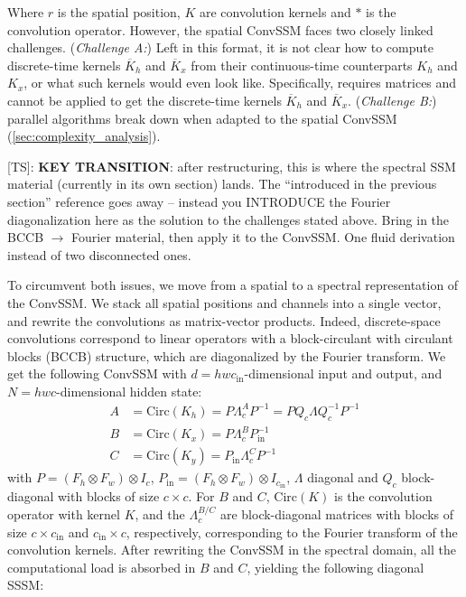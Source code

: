 \documentclass{article}
\newcommand{\TS}[1]{{\color{pink}[TS]: #1}}
\begin{document}
Where $r$ is the spatial position, $K$ are convolution kernels and $\ast$ is the convolution operator. However, the spatial ConvSSM faces two closely linked challenges.
%
(\emph{Challenge A:}) Left in this format, it is not clear how to compute discrete-time kernels $\overline{K}_h$ and $\overline{K}_x$ from their continuous-time counterparts $K_h$ and $K_x$, or what such kernels would even look like. Specifically,  requires matrices and cannot be applied to get the discrete-time kernels $\overline{K}_h$ and $\overline{K}_x$.
%
(\emph{Challenge B:}) parallel algorithms break down when adapted to the spatial ConvSSM (\cref{sec:complexity_analysis}).

\TS{\textbf{KEY TRANSITION}: after restructuring, this is where the spectral SSM material (currently in its own section) lands. The ``introduced in the previous section'' reference goes away -- instead you INTRODUCE the Fourier diagonalization here as the solution to the challenges stated above. Bring in the BCCB $\to$ Fourier material, then apply it to the ConvSSM. One fluid derivation instead of two disconnected ones.}

To circumvent both issues, we move from a spatial to a spectral representation of the ConvSSM. We stack all spatial positions and channels into a single vector, and rewrite the convolutions as matrix-vector products.
%
Indeed, discrete-space convolutions correspond to linear operators with a block-circulant with circulant blocks (BCCB) structure, which are diagonalized by the Fourier transform. We get the following ConvSSM with $d = h w c_\mathrm{in}$-dimensional input and output, and $N = h w c$-dimensional hidden state:
%
\begin{align}
\label{eq:convssm:A}
A &= \mathrm{Circ}(K_h) = P \Lambda^A_c P^{-1} = P Q_c \Lambda Q_c^{-1} P^{-1} \\
\label{eq:convssm:B}
B &= \mathrm{Circ}(K_x) = P \Lambda^B_c P_{\mathrm{in}}^{-1} \\
\label{eq:convssm:C}
C &= \mathrm{Circ}(K_y) = P_{\mathrm{in}} \Lambda^C_c P^{-1}
\end{align}
%
with $P = (F_h \otimes F_w) \otimes I_c$, $P_{\mathrm{in}} = (F_h \otimes F_w) \otimes I_{c_\mathrm{in}}$, $\Lambda$ diagonal and $Q_c$ block-diagonal with blocks of size $c \!\times\! c$. For $B$ and $C$, $\mathrm{Circ}(K)$ is the convolution operator with kernel $K$, and the $\Lambda^{B/C}_c$ are block-diagonal matrices with blocks of size $c \!\times\! c_\mathrm{in}$ and $c_\mathrm{in} \!\times\! c$, respectively, corresponding to the Fourier transform of the convolution kernels.
%
After rewriting the ConvSSM in the spectral domain, all the computational load is absorbed in $B$ and $C$, yielding the following diagonal SSSM:
\end{document}
